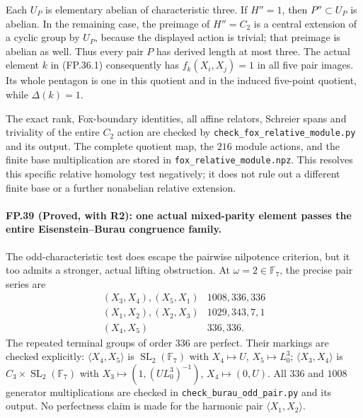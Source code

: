 Each $U_P$ is elementary abelian of characteristic three.
If $H''=1$, then $P''\subset U_P$ is abelian. In the remaining
case, the preimage of $H''=C_2$ is a central extension of a
cyclic group by $U_P$, because the displayed action is trivial;
that preimage is abelian as well. Thus every pair $P$ has
derived length at most three. The actual element $k$ in
(FP.36.1) consequently has $f_k(X_i,X_j)=1$ in all five pair
images. Its whole pentagon is one in this quotient and in the
induced five-point quotient, while $\Delta(k)=1$.

The exact rank, Fox-boundary identities, all affine relators,
Schreier spans and triviality of the entire $C_2$ action are
checked by \texttt{check\_fox\_relative\_module.py} and its
output. The complete quotient map, the $216$ module actions,
and the finite base multiplication are stored in
\texttt{fox\_relative\_module.npz}. This resolves this specific
relative homology test negatively; it does not rule out a
different finite base or a further nonabelian relative extension.

\paragraph{FP.39 (Proved, with R2): one actual mixed-parity element passes the entire Eisenstein--Burau congruence family.}
The odd-characteristic test does escape the pairwise nilpotence
criterion, but it too admits a stronger, actual lifting obstruction.
At $\omega=2\in\mathbb F_7$, the precise pair series are
\[
\begin{array}{c|c}
 (X_3,X_4),(X_5,X_1)&1008,336,336\\
 (X_1,X_2),(X_2,X_3)&1029,343,7,1\\
 (X_4,X_5)&336,336.
\end{array}
\]
The repeated terminal groups of order $336$ are perfect. Their
markings are checked explicitly: $\langle X_4,X_5\rangle$
is $\operatorname{SL}_2(\mathbb F_7)$ with
$X_4\mapsto U$, $X_5\mapsto L_0^3$;
$\langle X_3,X_4\rangle$ is
$C_3\times\operatorname{SL}_2(\mathbb F_7)$ with
$X_3\mapsto(1,(UL_0^3)^{-1})$, $X_4\mapsto(0,U)$.
All $336$ and $1008$ generator multiplications are checked in
\texttt{check\_burau\_odd\_pair.py} and its output.
No perfectness claim is made for the harmonic pair
$\langle X_1,X_2\rangle$.

